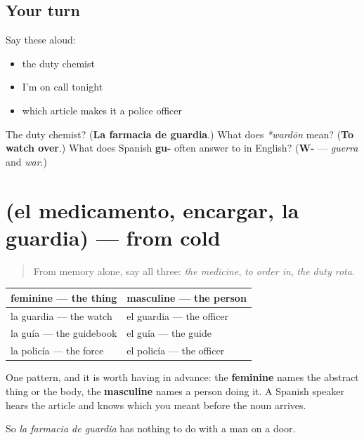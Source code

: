 \subsection*{Your turn}
Say these aloud:

\begin{itemize}
\raggedright
  \item the duty chemist
  \item I'm on call tonight
  \item which article makes it a police officer
\end{itemize}

\begin{tcolorbox}[breakable,colback=teal!4,colframe=teal!35!black,title={Before you move on}]
The duty chemist? (\textbf{La farmacia de guardia}.) What does \emph{*wardōn} mean? (\textbf{To watch over}.) What does Spanish \textbf{gu-} often answer to in English? (\textbf{W-} — \emph{guerra} and \emph{war}.)
\end{tcolorbox}
\section[(el medicamento, encargar, la guardia)]{(el medicamento, encargar, la guardia) — from cold}

\label{lesson:ES-R457-repaso-guardia}



\begin{quote}
From memory alone, say all three: \emph{the medicine}, \emph{to order in}, \emph{the duty rota}.
\end{quote}

\begin{grammarlens}[title={Grammar Lens: the article doing the work}]
\noindent
\begin{tabularx}{\linewidth}{@{}>{\raggedright\arraybackslash}X>{\raggedright\arraybackslash}X@{}}
\toprule
\textbf{feminine — the thing} & \textbf{masculine — the person} \\
\midrule
la guardia — the watch & el guardia — the officer \\
la guía — the guidebook & el guía — the guide \\
la policía — the force & el policía — the officer \\
\bottomrule
\end{tabularx}

One pattern, and it is worth having in advance: the \textbf{feminine} names the abstract thing or the body, the \textbf{masculine} names a person doing it. A Spanish speaker hears the article and knows which you meant before the noun arrives.

So \emph{la farmacia de guardia} has nothing to do with a man on a door.
\end{grammarlens}

